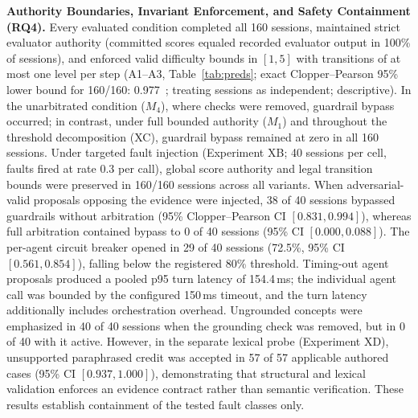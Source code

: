 \noindent\textbf{Authority Boundaries, Invariant Enforcement, and Safety Containment (RQ4).} Every evaluated condition completed all 160 sessions, maintained strict evaluator authority (committed scores equaled recorded evaluator output in 100\% of sessions), and enforced valid difficulty bounds in $[1, 5]$ with transitions of at most one level per step (A1--A3, Table~\ref{tab:preds}; exact Clopper--Pearson 95\% lower bound for 160/160: 0.977~\cite{cp34}; treating sessions as independent; descriptive). In the unarbitrated condition ($M_4$), where checks were removed, guardrail bypass occurred; in contrast, under full bounded authority ($M_1$) and throughout the threshold decomposition (XC), guardrail bypass remained at zero in all 160 sessions. Under targeted fault injection (Experiment XB; 40 sessions per cell, faults fired at rate 0.3 per call), global score authority and legal transition bounds were preserved in 160/160 sessions across all variants. When adversarial-valid proposals opposing the evidence were injected, 38 of 40 sessions bypassed guardrails without arbitration (95\% Clopper--Pearson CI $[0.831, 0.994]$), whereas full arbitration contained bypass to 0 of 40 sessions (95\% CI $[0.000, 0.088]$). The per-agent circuit breaker opened in 29 of 40 sessions (72.5\%, 95\% CI $[0.561, 0.854]$), falling below the registered 80\% threshold. Timing-out agent proposals produced a pooled p95 turn latency of 154.4\,ms; the individual agent call was bounded by the configured 150\,ms timeout, and the turn latency additionally includes orchestration overhead. Ungrounded concepts were emphasized in 40 of 40 sessions when the grounding check was removed, but in 0 of 40 with it active. However, in the separate lexical probe (Experiment XD), unsupported paraphrased credit was accepted in 57 of 57 applicable authored cases (95\% CI $[0.937, 1.000]$), demonstrating that structural and lexical validation enforces an evidence contract rather than semantic verification. These results establish containment of the tested fault classes only.
